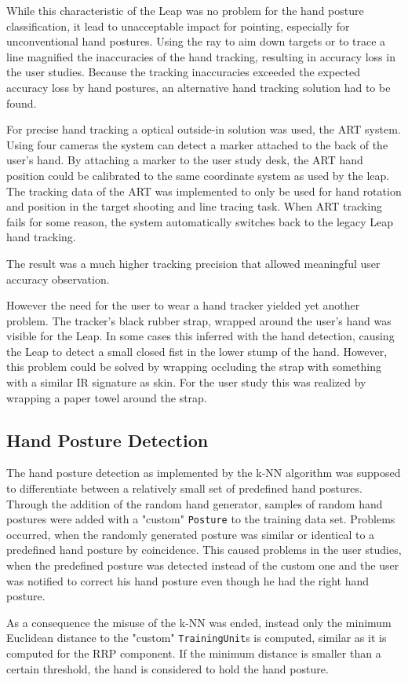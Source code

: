 While this characteristic of the Leap was no problem for the hand posture classification, it lead to unacceptable impact for pointing, especially for unconventional hand postures. Using the ray to aim down targets or to trace a line magnified the inaccuracies of the hand tracking, resulting in accuracy loss in the user studies. Because the tracking inaccuracies exceeded the expected accuracy loss by hand postures, an alternative hand tracking solution had to be found.

For precise hand tracking a optical outside-in solution was used, the ART system. Using four cameras the system can detect a marker attached to the back of the user's hand. By attaching a marker to the user study desk, the ART hand position could be calibrated to the same coordinate system as used by the leap. The tracking data of the ART was implemented to only be used for hand rotation and position in the target shooting and line tracing task. When ART tracking fails for some reason, the system automatically switches back to the legacy Leap hand tracking.  

The result was a much higher tracking precision that allowed meaningful user accuracy observation.  

However the need for the user to wear a hand tracker yielded yet another problem. The tracker's black rubber strap, wrapped around the user's hand was visible for the Leap. In some cases this inferred with the hand detection, causing the Leap to detect a small closed fist in the lower stump of the hand. However, this problem could be solved by wrapping occluding the strap with something with a similar IR signature as skin. For the user study this was realized by wrapping a paper towel around the strap. 

\subsection{Hand Posture Detection}

The hand posture detection as implemented by the k-NN algorithm was supposed to differentiate between a relatively small set of predefined hand postures. Through the addition of the random hand generator, samples of random hand postures were added with a "custom" \texttt{Posture} to the training data set. Problems occurred, when the randomly generated posture was similar or identical to a predefined hand posture by coincidence. This caused problems in the user studies, when the predefined posture was detected instead of the custom one and the user was notified to correct his hand posture even though he had the right hand posture. 

As a consequence the misuse of the k-NN was ended, instead only the minimum Euclidean distance to the "custom" \texttt{TrainingUnit}s is computed, similar as it is computed for the RRP component. If the minimum distance is smaller than a certain threshold, the hand is considered to hold the hand posture.
